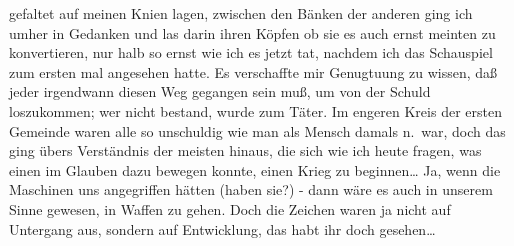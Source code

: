 \documentclass[
]{article}
\begin{document}
gefaltet auf meinen Knien lagen, zwischen den Bänken der anderen ging
ich umher in Gedanken und las darin ihren Köpfen ob sie es auch ernst
meinten zu konvertieren, nur halb so ernst wie ich es jetzt tat, nachdem
ich das Schauspiel zum ersten mal angesehen hatte. Es verschaffte mir
Genugtuung zu wissen, daß jeder irgendwann diesen Weg gegangen sein muß,
um von der Schuld loszukommen; wer nicht bestand, wurde zum Täter. Im
engeren Kreis der ersten Gemeinde waren alle so unschuldig wie man als
Mensch damals n.~war, doch das ging übers Verständnis der meisten
hinaus, die sich wie ich heute fragen, was einen im Glauben dazu bewegen
konnte, einen Krieg zu beginnen\ldots{} Ja, wenn die Maschinen uns
angegriffen hätten (haben sie?) - dann wäre es auch in unserem Sinne
gewesen, in Waffen zu gehen. Doch die Zeichen waren ja nicht auf
Untergang aus, sondern auf Entwicklung, das habt ihr doch
gesehen\ldots{}
\end{document}
